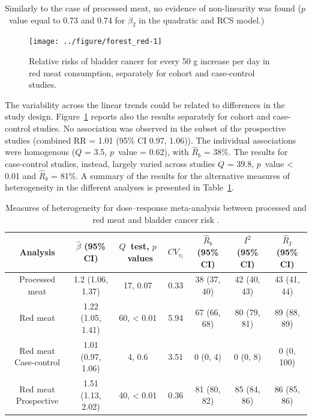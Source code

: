 \documentclass[11pt,a4paper,twoside,openany]{book}\usepackage{knitr}
\begin{document}
{{\noindent Similarly to the case of processed meat, no evidence of non-linearity was found ($p$~value equal to 0.73 and 0.74 for $\beta_2$ in the quadratic and RCS model.)

\begin{knitrout}\footnotesize
{}\color{fgcolor}\begin{figure}[ht!]

{\centering \texttt{[image: ../figure/forest\_red-1]} 

}

\caption[Relative risks of bladder cancer for every 50 g increase per day in red meat consumption, separately for cohort and case-control studies]{Relative risks of bladder cancer for every 50 g increase per day in red meat consumption, separately for cohort and case-control studies.}\label{fig:forest_red}
\end{figure}


\end{knitrout}

The variability across the linear trends could be related to differences in the study design. Figure~\ref{fig:forest_red} reports also the results separately for cohort and case-control studies. No association was observed in the subset of the prospective studies (combined RR = 1.01 (95\% CI 0.97, 1.06)). The individual associations were homogenous ($Q $ = 3.5, $p$~value = 0.62), with $\hat R_b$ = 38\%. The results for case-control studies, instead, largely varied across studies $Q $ = 39.8, $p$~value < 0.01 and $\hat R_b$ = 81\%. A summary of the results for the alternative measures of heterogeneity in the different analyses is presented in Table~\ref{tab:tab_rb}.

\begin{table}[!h]

\caption{\label{tab:tab_rb}Measures of heterogeneity for dose--response meta-analysis between processed and red meat and bladder cancer risk \citep{crippa2016red}.}
\centering
\fontsize{8.5}{10.5}\selectfont
\begin{tabular}[t]{ccccccc}
\toprule
Analysis & $\hat \beta$ (95\% CI) & $Q$~test, $p$~values & $CV_{v_i}$ & $\hat R_b$ (95\% CI) & $I^2$ (95\% CI) & $\hat R_I$ (95\% CI)\\
\midrule
Processed meat & 1.2 (1.06, 1.37) & 17, 0.07 & 0.33 & 38 (37, 40) & 42 (40, 43) & 43 (41, 44)\\
Red meat & 1.22 (1.05, 1.41) & 60, < 0.01 & 5.94 & 67 (66, 68) & 80 (79, 81) & 89 (88, 89)\\
Red meat Case-control & 1.01 (0.97, 1.06) & 4, 0.6 & 3.51 & 0 (0, 4) & 0 (0, 8) & 0 (0, 100)\\
Red meat Prospective & 1.51 (1.13, 2.02) & 40, < 0.01 & 0.36 & 81 (80, 82) & 85 (84, 86) & 86 (85, 86)\\
\bottomrule
\end{tabular}
\end{table}










}}
\end{document}
